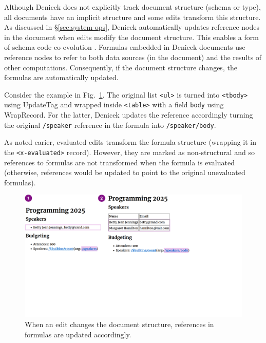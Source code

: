 \documentclass[sigconf,anonymous,screen]{acmart}
\newcommand{\ident}[1]{{\sffamily #1}}
\begin{document}
Although Denicek does not explicitly track document structure (schema or type), all documents
have an implicit structure and some edits transform this structure. As
discussed in \S\ref{sec:system-ops}, Denicek automatically updates reference nodes in the
document when edits modify the document structure. This enables a form of schema code
co-evolution \cite{edwards-2025-schema}. Formulas embedded in Denicek documents use reference
nodes to refer to both data sources (in the document) and the results of other computations.
Consequently, if the document structure changes, the formulas are automatically updated.

Consider the example in Fig.~\ref{fig:coevolution}. The original list {\small\Verb_<ul>_} is
turned into {\small\Verb_<tbody>_} using \ident{UpdateTag} and wrapped inside {\small\Verb_<table>_}
with a field {\small\Verb_body_} using \ident{WrapRecord}. For the latter, Denicek updates the
reference accordingly turning the original {\small\Verb_/speaker_} reference in the formula
into {\small\Verb_/speaker/body_}.

As noted earier, evaluated edits transform the formula structure (wrapping it in the
{\small\Verb_<x-evaluated>_} record). However, they are marked as non-structural and so
references to formulas are not transformed when the formula is evaluated (otherwise, references
would be updated to point to the original unevaluated formulas).


\begin{figure}[t]
\includegraphics[width=0.9\columnwidth,clip,trim=0cm 9.5cm 8cm 0cm]{fig/coevolution.pdf}
\caption{When an edit changes the document structure, references in formulas are updated accordingly.}
\label{fig:coevolution}
\end{figure}
\end{document}
